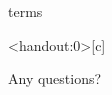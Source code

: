 \documentclass[
        ]{beamer}
\begin{document}
        \begin{frame}[c]{\subsecname terms}
            \begin{overprint}
            \end{overprint}   
        \end{frame}  
    
    \begin{frame}<handout:0>[c]{\secname}
        \centerline{\Large{Any questions?}}
    \end{frame}
    
    
    
\end{document}
